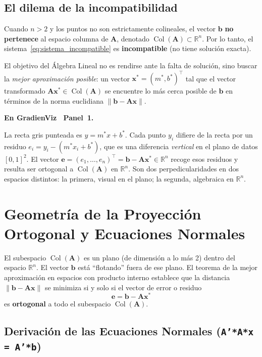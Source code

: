 ﻿\documentclass[12pt, a4paper]{article}
\newenvironment{viznota}[1]{%
    \begin{mdframed}[style=vizverde]
    \textbf{\color{bordeteo}En GradienViz \textemdash\ #1.}\quad
}{%
    \end{mdframed}
}
\newcommand{\R}{\mathbb{R}}
\newcommand{\mstar}{m^{*}}
\newcommand{\bstar}{b^{*}}
\newcommand{\T}{{\top}}
\begin{document}
\subsection{El dilema de la incompatibilidad}

Cuando $n > 2$ y los puntos no son estrictamente colineales, el vector $\mathbf{b}$ \textbf{no pertenece} al espacio columna de $\mathbf{A}$, denotado $\operatorname{Col}(\mathbf{A}) \subset \R^n$. Por lo tanto, el sistema~\eqref{eq:sistema_incompatible} es \textbf{incompatible} (no tiene solución exacta).

El objetivo del Álgebra Lineal no es rendirse ante la falta de solución, sino buscar la \emph{mejor aproximación posible}: un vector $\mathbf{x}^* = (\mstar, \bstar)^\T$ tal que el vector transformado $\mathbf{A}\mathbf{x}^* \in \operatorname{Col}(\mathbf{A})$ se encuentre lo más cerca posible de $\mathbf{b}$ en términos de la norma euclidiana $\|\mathbf{b} - \mathbf{A}\mathbf{x}\|$.

\begin{viznota}{Panel~1}
La recta gris punteada es $y = \mstar x + \bstar$. Cada punto $y_i$ difiere de la recta por un residuo $e_i = y_i - (\mstar x_i + \bstar)$, que es una diferencia \emph{vertical} en el plano de datos $[0,1]^2$. El vector $\mathbf{e} = (e_1, \ldots, e_n)^\T = \mathbf{b} - \mathbf{A}\mathbf{x}^* \in \R^n$ recoge esos residuos y resulta ser ortogonal a $\operatorname{Col}(\mathbf{A})$ en $\R^n$. Son dos perpedicularidades en dos espacios distintos: la primera, visual en el plano; la segunda, algebraica en $\R^n$.
\end{viznota}

\section{Geometría de la Proyección Ortogonal y Ecuaciones Normales}

El subespacio $\operatorname{Col}(\mathbf{A})$ es un plano (de dimensión a lo más 2) dentro del espacio $\R^n$. El vector $\mathbf{b}$ está ``flotando'' fuera de ese plano. El teorema de la mejor aproximación en espacios con producto interno establece que la distancia $\|\mathbf{b} - \mathbf{A}\mathbf{x}\|$ se minimiza si y solo si el vector de error o residuo
\[
    \mathbf{e} = \mathbf{b} - \mathbf{A}\mathbf{x}^*
\]
es \textbf{ortogonal} a todo el subespacio $\operatorname{Col}(\mathbf{A})$.

\subsection{Derivación de las Ecuaciones Normales (\texttt{A'*A*x = A'*b})}
\end{document}
